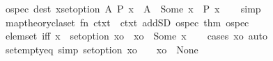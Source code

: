 \begin{isabellebody}
{\isafoldproof}%
%
\isadelimproof
%
\endisadelimproof
%
\isadelimdocument
%
\endisadelimdocument
%
\isatagdocument
%
\isamarkuptrue%
%
\endisatagdocument
{\isafolddocument}%
%
\isadelimdocument
%
\endisadelimdocument
{}\isamarkupfalse%
\ ospec\ {\isacharbrackleft}{\kern0pt}dest{\isacharbrackright}{\kern0pt}{\isacharcolon}{\kern0pt}\ {\isachardoublequoteopen}{\isacharparenleft}{\kern0pt}{\isasymforall}x{\isasymin}set{\isacharunderscore}{\kern0pt}option\ A{\isachardot}{\kern0pt}\ P\ x{\isacharparenright}{\kern0pt}\ {\isasymLongrightarrow}\ A\ {\isacharequal}{\kern0pt}\ Some\ x\ {\isasymLongrightarrow}\ P\ x{\isachardoublequoteclose}\isanewline
%
\isadelimproof
\ \ %
\endisadelimproof
%
\isatagproof
{}\isamarkupfalse%
\ simp%
\endisatagproof
{\isafoldproof}%
%
\isadelimproof
\isanewline
%
\endisadelimproof
%
\isadelimML
\isanewline
%
\endisadelimML
%
\isatagML
{}\isamarkupfalse%
\ {\isacartoucheopen}map{\isacharunderscore}{\kern0pt}theory{\isacharunderscore}{\kern0pt}claset\ {\isacharparenleft}{\kern0pt}fn\ ctxt\ {\isacharequal}{\kern0pt}{\isachargreater}{\kern0pt}\ ctxt\ addSD{}\ {\isacharparenleft}{\kern0pt}{\isachardoublequote}{\kern0pt}ospec{\isachardoublequote}{\kern0pt}{\isacharcomma}{\kern0pt}\ {\isacharat}{\kern0pt}{\isacharbraceleft}{\kern0pt}thm\ ospec{\isacharbraceright}{\kern0pt}{\isacharparenright}{\kern0pt}{\isacharparenright}{\kern0pt}{\isacartoucheclose}%
\endisatagML
{\isafoldML}%
%
\isadelimML
\isanewline
%
\endisadelimML
\isanewline
{}\isamarkupfalse%
\ elem{\isacharunderscore}{\kern0pt}set\ {\isacharbrackleft}{\kern0pt}iff{\isacharbrackright}{\kern0pt}{\isacharcolon}{\kern0pt}\ {\isachardoublequoteopen}{\isacharparenleft}{\kern0pt}x\ {\isasymin}\ set{\isacharunderscore}{\kern0pt}option\ xo{\isacharparenright}{\kern0pt}\ {\isacharequal}{\kern0pt}\ {\isacharparenleft}{\kern0pt}xo\ {\isacharequal}{\kern0pt}\ Some\ x{\isacharparenright}{\kern0pt}{\isachardoublequoteclose}\isanewline
%
\isadelimproof
\ \ %
\endisadelimproof
%
\isatagproof
{}\isamarkupfalse%
\ {\isacharparenleft}{\kern0pt}cases\ xo{\isacharparenright}{\kern0pt}\ auto%
\endisatagproof
{\isafoldproof}%
%
\isadelimproof
\isanewline
%
\endisadelimproof
\isanewline
{}\isamarkupfalse%
\ set{\isacharunderscore}{\kern0pt}empty{\isacharunderscore}{\kern0pt}eq\ {\isacharbrackleft}{\kern0pt}simp{\isacharbrackright}{\kern0pt}{\isacharcolon}{\kern0pt}\ {\isachardoublequoteopen}{\isacharparenleft}{\kern0pt}set{\isacharunderscore}{\kern0pt}option\ xo\ {\isacharequal}{\kern0pt}\ {\isacharbraceleft}{\kern0pt}{\isacharbraceright}{\kern0pt}{\isacharparenright}{\kern0pt}\ {\isacharequal}{\kern0pt}\ {\isacharparenleft}{\kern0pt}xo\ {\isacharequal}{\kern0pt}\ None{\isacharparenright}{\kern0pt}{\isachardoublequoteclose}\isanewline

\end{isabellebody}
